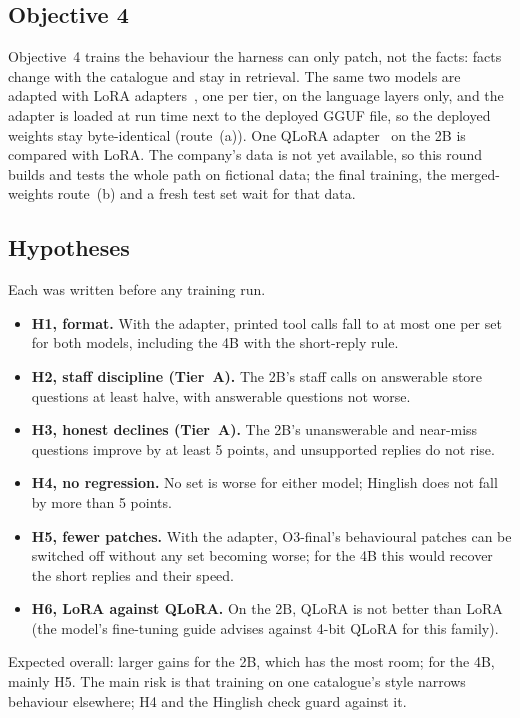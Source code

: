 \documentclass[11pt,a4paper]{article}
\begin{document}
\subsection{Objective 4}
Objective~4 trains the behaviour the harness can only patch, not the facts: facts change with the catalogue and stay in
retrieval. The same two models are adapted with LoRA adapters~\cite{lora}, one per tier, on the language layers only, and
the adapter is loaded at run time next to the deployed GGUF file, so the deployed weights stay byte-identical (route~(a)).
One QLoRA adapter~\cite{qlora} on the 2B is compared with LoRA. The company's data is not yet available, so this round
builds and tests the whole path on fictional data; the final training, the merged-weights route~(b) and a fresh test set
wait for that data.

\subsection{Hypotheses}
Each was written before any training run.
\begin{itemize}
  \item \textbf{H1, format.} With the adapter, printed tool calls fall to at most one per set for both models, including the
        4B with the short-reply rule.
  \item \textbf{H2, staff discipline (Tier~A).} The 2B's staff calls on answerable store questions at least halve, with
        answerable questions not worse.
  \item \textbf{H3, honest declines (Tier~A).} The 2B's unanswerable and near-miss questions improve by at least 5 points,
        and unsupported replies do not rise.
  \item \textbf{H4, no regression.} No set is worse for either model; Hinglish does not fall by more than 5 points.
  \item \textbf{H5, fewer patches.} With the adapter, O3-final's behavioural patches can be switched off without any set
        becoming worse; for the 4B this would recover the short replies and their speed.
  \item \textbf{H6, LoRA against QLoRA.} On the 2B, QLoRA is not better than LoRA (the model's fine-tuning guide advises
        against 4-bit QLoRA for this family).
\end{itemize}
Expected overall: larger gains for the 2B, which has the most room; for the 4B, mainly H5. The main risk is that training
on one catalogue's style narrows behaviour elsewhere; H4 and the Hinglish check guard against it.
\end{document}
